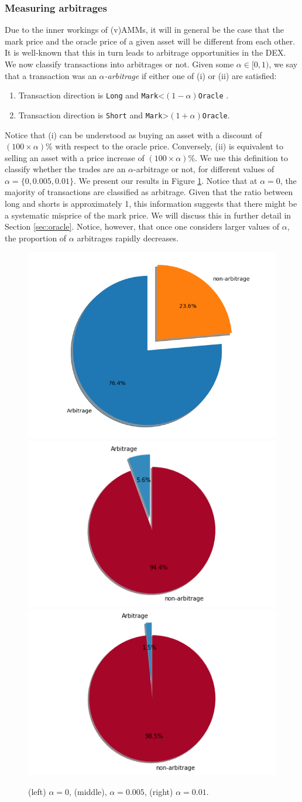 \documentclass[]{scrartcl}
\begin{document}
	
	\subsubsection*{Measuring arbitrages} 
	Due to the inner workings of (v)AMMs, it will in general be the case that the mark price and the oracle price of a given asset will be  different from each other. It is well-known that this in turn leads to arbitrage opportunities in the DEX.  We now classify transactions into arbitrages or not. Given some $\alpha\in[0,1)$, we say that a transaction was an \emph{$\alpha$-arbitrage} if  either one of (i) or (ii) are satisfied: \begin{enumerate}
		\item[(i)] Transaction  direction is \texttt{Long} and \texttt{Mark}<$(1-\alpha)$\texttt{Oracle} .
		\item[(ii)] Transaction direction is  \texttt{Short} and \texttt{Mark}>$(1+\alpha)$\texttt{Oracle}. 
	\end{enumerate}
	Notice that (i) can be understood as buying an asset with a discount of $(100\times\alpha)$\% with respect to the oracle price. Conversely, (ii) is equivalent to selling an asset with a price increase of $(100\times \alpha)$\%. We use this definition to classify whether the trades are an $\alpha$-arbitrage or not, for different values of  $\alpha=\{0,0.005,0.01\}$. We present our results in Figure \ref{fig:piearb0}. Notice that at $\alpha=0$,  the majority of transactions are classified as arbitrage. Given that the ratio between long and shorts is approximately 1,  this information suggests that there might be a systematic misprice of the mark price. We will discuss this in further detail in Section \ref{sec:oracle}. Notice, however, that once one considers larger values of $\alpha$, the proportion of $\alpha$ arbitrages rapidly decreases.
	
	
	\begin{figure}
		\centering
		\includegraphics[width=0.32\linewidth]{figures/pie_arb00}
		\includegraphics[width=0.32\linewidth]{figures/pie_arb05}
		\includegraphics[width=0.32\linewidth]{figures/pie_arb}
		\caption{(left) $\alpha=0$, (middle), $\alpha=0.005$, (right) $\alpha=0.01$.}
		\label{fig:piearb0}
	\end{figure}
	
\end{document}
